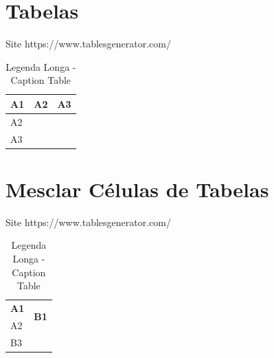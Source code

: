 \documentclass[12pt]{article}
\begin{document}
\newpage
\section{Tabelas}

Site https://www.tablesgenerator.com/

\begin{table}[H]
	\centering
	\caption[legenda curta]{Legenda Longa - Caption Table}
	\label{tab:Label Table}
	\begin{tabular}{|l|l|l|}
		\hline
		\textbf{A1} & \textbf{A2} & \textbf{A3} \\ \hline
		A2          &             &             \\ \hline
		A3          &             &             \\ \hline
	\end{tabular}
\end{table}

\newpage
\section{Mesclar Células de Tabelas}

Site https://www.tablesgenerator.com/

\begin{table}[H]
	\centering
	\caption[legenda curta]{Legenda Longa - Caption Table}
	\label{tab:Label Table}
	\begin{tabular}{|l|l|l|}
		\hline
		\textbf{A1} & \multicolumn{2}{l|}{\multirow{2}{*}{\textbf{B1}}}\\ \cline{1-1}
		A2          &  \multicolumn{2}{l|}{}          \\ \hline
		B3          &             &                   \\ \hline
	\end{tabular}
\end{table}
	
\end{document}
